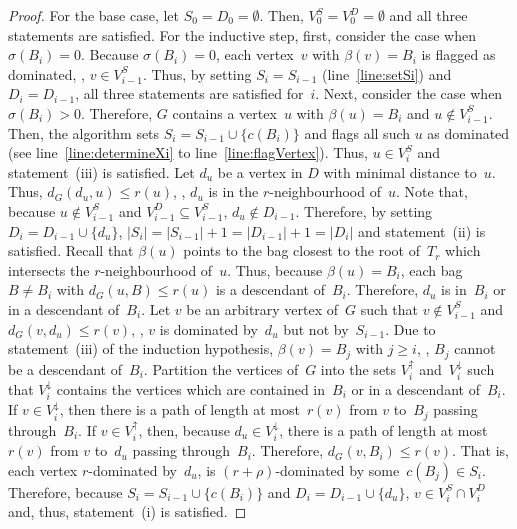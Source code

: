 \begin{proof}
For the base case, let $S_0 = D_0 = \emptyset$.
Then, $V^S_0 = V^D_0 = \emptyset$ and all three statements are satisfied.
For the inductive step, first, consider the case when $\sigma(B_i) = 0$.
Because $\sigma(B_i) = 0$, each vertex~$v$ with $\beta(v) = B_i$ is flagged as dominated, \ie, $v \in V^S_{i-1}$.
Thus, by setting $S_i = S_{i - 1}$ (line~\ref{line:setSi}) and $D_i = D_{i - 1}$, all three statements are satisfied for~$i$.
Next, consider the case when $\sigma(B_i) > 0$.
Therefore, $G$ contains a vertex~$u$ with $\beta(u) = B_i$ and $u \notin V^S_{i-1}$.
Then, the algorithm sets $S_i = S_{i-1} \cup \big \{ c(B_i) \big \}$ and flags all such $u$ as dominated (see line~\ref{line:determineXi} to line~\ref{line:flagVertex}).
Thus, $u \in V^S_i$ and statement~(iii) is satisfied.
%
Let $d_u$ be a vertex in $D$ with minimal distance to~$u$.
Thus, $d_G(d_u, u) \leq r(u)$, \ie, $d_u$ is in the $r$-neighbourhood of~$u$.
Note that, because $u \notin V^S_{i-1}$ and $V^D_{i-1} \subseteq V^S_{i-1}$, $d_u \notin D_{i-1}$.
Therefore, by setting $D_i = D_{i-1} \cup \{ d_u \}$, $|S_i| = |S_{i-1}| + 1 = |D_{i-1}| + 1 = |D_i|$ and statement~(ii) is satisfied.
%
Recall that $\beta(u)$ points to the bag closest to the root of~$T_r$ which intersects the $r$-neighbourhood of~$u$.
Thus, because $\beta(u) = B_i$, each bag~$B \neq B_i$ with $d_G(u, B) \leq r(u)$ is a descendant of~$B_i$.
Therefore, $d_u$ is in~$B_i$ or in a descendant of~$B_i$.
Let $v$ be an arbitrary vertex of~$G$ such that $v \notin V^S_{i-1}$ and $d_G(v, d_u) \leq r(v)$, \ie, $v$ is dominated by~$d_u$ but not by~$S_{i-1}$.
Due to statement~(iii) of the induction hypothesis, $\beta(v) = B_j$ with $j \geq i$, \ie, $B_j$ cannot be a descendant of~$B_i$.
Partition the vertices of~$G$ into the sets $V^\uparrow_i$ and~$V^\downarrow_i$ such that $V^\downarrow_i$ contains the vertices which are contained in~$B_i$ or in a descendant of~$B_i$.
If $v \in V^\downarrow_i$, then there is a path of length at most~$r(v)$ from $v$ to~$B_j$ passing through~$B_i$.
If $v \in V^\uparrow_i$, then, because $d_u \in V^\downarrow_i$, there is a path of length at most~$r(v)$ from $v$ to~$d_u$ passing through~$B_i$.
Therefore, $d_G(v, B_i) \leq r(v)$.
That is, each vertex $r$-dominated by~$d_u$, is $(r + \rho)$-dominated by some~$c(B_j) \in S_i$.
Therefore, because $S_i = S_{i-1} \cup \big \{ c(B_i) \big \}$ and $D_i = D_{i-1} \cup \{ d_u \}$, $v \in V^S_i \cap V^D_i $ and, thus, statement~(i) is satisfied.
\end{proof}

